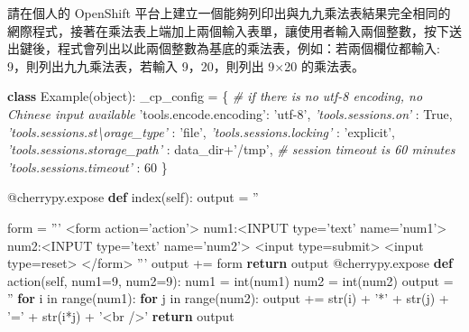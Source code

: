 \documentclass[]{article}
\newenvironment{Shaded}{}{}
\newcommand{\KeywordTok}[1]{\textcolor[rgb]{0.00,0.44,0.13}{\textbf{{#1}}}}
\newcommand{\DataTypeTok}[1]{\textcolor[rgb]{0.56,0.13,0.00}{{#1}}}
\newcommand{\DecValTok}[1]{\textcolor[rgb]{0.25,0.63,0.44}{{#1}}}
\newcommand{\StringTok}[1]{\textcolor[rgb]{0.25,0.44,0.63}{{#1}}}
\newcommand{\CommentTok}[1]{\textcolor[rgb]{0.38,0.63,0.69}{\textit{{#1}}}}
\newcommand{\OtherTok}[1]{\textcolor[rgb]{0.00,0.44,0.13}{{#1}}}
\newcommand{\NormalTok}[1]{{#1}}
\begin{document}
請在個人的 OpenShift
平台上建立一個能夠列印出與九九乘法表結果完全相同的網際程式，接著在乘法表上端加上兩個輸入表單，讓使用者輸入兩個整數，按下送出鍵後，程式會列出以此兩個整數為基底的乘法表，例如：若兩個欄位都輸入:
9，則列出九九乘法表，若輸入 9，20，則列出 9×20 的乘法表。

\begin{Shaded}
\begin{Highlighting}[]
\KeywordTok{class} \NormalTok{Example(}\DataTypeTok{object}\NormalTok{):}
\NormalTok{_cp_config = \{}
\CommentTok{# if there is no utf-8 encoding, no Chinese input available}
\StringTok{'tools.encode.encoding'}\NormalTok{: }\StringTok{'utf-8'}\NormalTok{,}
\CommentTok{'tools.sessions.on'} \NormalTok{: }\OtherTok{True}\NormalTok{,}
\CommentTok{'tools.sessions.st\textbackslash{}orage_type'} \NormalTok{: }\StringTok{'file'}\NormalTok{,}
\CommentTok{'tools.sessions.locking'} \NormalTok{: }\StringTok{'explicit'}\NormalTok{,}
\CommentTok{'tools.sessions.storage_path'} \NormalTok{: data_dir+}\StringTok{'/tmp'}\NormalTok{,}
\CommentTok{# session timeout is 60 minutes}
\CommentTok{'tools.sessions.timeout'} \NormalTok{: }\DecValTok{60}
\NormalTok{\}}

\OtherTok{@cherrypy.expose}
\KeywordTok{def} \NormalTok{index(}\OtherTok{self}\NormalTok{):}
    \NormalTok{output = }\StringTok{''}

    \NormalTok{form = }\StringTok{'''}
\StringTok{    <form action='action'>}
\StringTok{    num1:<INPUT type='text' name='num1'>}
\StringTok{    num2:<INPUT type='text'  name='num2'>}
\StringTok{    <input type=submit>}
\StringTok{    <input type=reset>}
\StringTok{    </form>}
\StringTok{    '''}
    \NormalTok{output += form}
    \KeywordTok{return} \NormalTok{output}
\OtherTok{@cherrypy.expose}
\KeywordTok{def} \NormalTok{action(}\OtherTok{self}\NormalTok{, num1=}\DecValTok{9}\NormalTok{, num2=}\DecValTok{9}\NormalTok{):}
    \NormalTok{num1 = }\DataTypeTok{int}\NormalTok{(num1)}
    \NormalTok{num2 = }\DataTypeTok{int}\NormalTok{(num2)}
    \NormalTok{output = }\StringTok{''}
    \KeywordTok{for} \NormalTok{i in }\DataTypeTok{range}\NormalTok{(num1):}
        \KeywordTok{for} \NormalTok{j in }\DataTypeTok{range}\NormalTok{(num2):}
            \NormalTok{output += }\DataTypeTok{str}\NormalTok{(i) + }\StringTok{'*'} \NormalTok{+ }\DataTypeTok{str}\NormalTok{(j) + }\StringTok{'='} \NormalTok{+ }\DataTypeTok{str}\NormalTok{(i*j) + }\StringTok{'<br />'}
    \KeywordTok{return} \NormalTok{output}
\end{Highlighting}
\end{Shaded}
\end{document}
